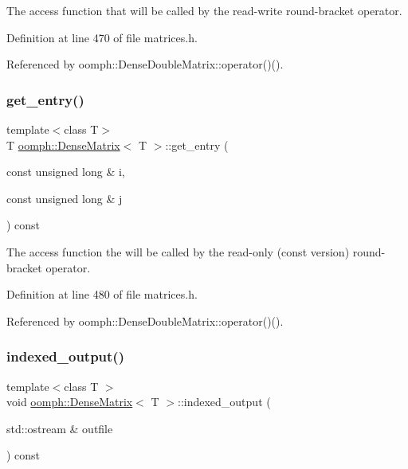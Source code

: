 The access function that will be called by the read-\/write round-\/bracket operator. 



Definition at line 470 of file matrices.\+h.



Referenced by oomph\+::\+Dense\+Double\+Matrix\+::operator()().

\mbox{\label{classoomph_1_1DenseMatrix_a0b03682b4c7d8f820599bd2681a01ee0}} 
\subsubsection{\texorpdfstring{get\+\_\+entry()}{get\_entry()}}
{\footnotesize\ttfamily template$<$class T$>$ \\
T \hyperlink{classoomph_1_1DenseMatrix}{oomph\+::\+Dense\+Matrix}$<$ T $>$\+::get\+\_\+entry (\begin{DoxyParamCaption}\item[{const unsigned long \&}]{i,  }\item[{const unsigned long \&}]{j }\end{DoxyParamCaption}) const\hspace{0.3cm}{\ttfamily [inline]}}



The access function the will be called by the read-\/only (const version) round-\/bracket operator. 



Definition at line 480 of file matrices.\+h.



Referenced by oomph\+::\+Dense\+Double\+Matrix\+::operator()().

\mbox{\label{classoomph_1_1DenseMatrix_a440b549690cfc07c85f395eb06951321}} 
\subsubsection{\texorpdfstring{indexed\+\_\+output()}{indexed\_output()}\hspace{0.1cm}{\footnotesize\ttfamily [1/2]}}
{\footnotesize\ttfamily template$<$class T $>$ \\
void \hyperlink{classoomph_1_1DenseMatrix}{oomph\+::\+Dense\+Matrix}$<$ T $>$\+::indexed\+\_\+output (\begin{DoxyParamCaption}\item[{std\+::ostream \&}]{outfile }\end{DoxyParamCaption}) const}



